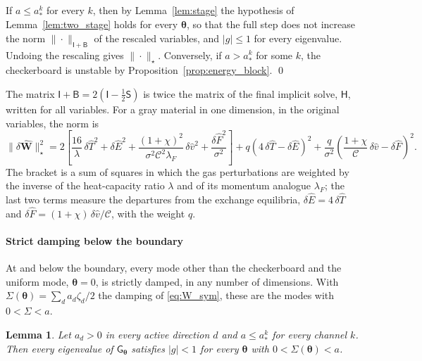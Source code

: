 \documentclass[preprint,12pt,authoryear]{elsarticle}
\newcommand{\tenS}{\mathsf{S}}
\newcommand{\tenI}{\mathsf{I}}
\newcommand{\tenG}{\mathsf{G}}
\providecommand{\tenB}{\mathsf{B}}
\newtheorem{lem}{Lemma}
\providecommand{\tenH}{\mathsf{H}}
\newcommand{\hE}{\hat{E}}
\newcommand{\hv}{\hat{v}}
\newcommand{\hF}{\hat{F}}
\newcommand{\hT}{\hat{T}}
\newcommand{\hvecW}{{\hat{\mathbf{W}}}}
\newcommand{\calC}{\mathcal{C}}
\begin{document}
\begin{appendix}
\begin{pfcb}
If $a \leq a_*^k$ for every $k$, then by Lemma~\ref{lem:stage} the hypothesis of Lemma~\ref{lem:two_stage} holds for every $\boldsymbol{\theta}$, so that the full step does not increase the norm $\|\cdot\|_{\tenI + \tenB}$ of the rescaled variables, and $|g| \leq 1$ for every eigenvalue. Undoing the rescaling gives $\|\cdot\|_\star$. Conversely, if $a > a_*^k$ for some $k$, the checkerboard is unstable by Proposition~\ref{prop:energy_block}. \qed
\end{pfcb}

The matrix $\tenI + \tenB = 2(\tenI - \tfrac{1}{2}\tenS)$ is twice the matrix of the final implicit solve, $\tenH$, written for all variables. For a gray material in one dimension, in the original variables, the norm is
\begin{equation}
    \|\delta\hvecW\|_\star^2 = 2\left[\frac{16}{\lambda}\,\delta\hT^2 + \delta\hE^2 + \frac{(1 + \chi)^2}{\sigma^2\calC^2\lambda_F}\,\delta\hv^2 + \frac{\delta\hF^2}{\sigma^2}\right] + q\left(4\,\delta\hT - \delta\hE\right)^2 + \frac{q}{\sigma^2}\left(\frac{1 + \chi}{\calC}\,\delta\hv - \delta\hF\right)^2 .
    \label{eq:H_star}
\end{equation}
The bracket is a sum of squares in which the gas perturbations are weighted by the inverse of the heat-capacity ratio $\lambda$ and of its momentum analogue $\lambda_F$; the last two terms measure the departures from the exchange equilibria, $\delta\hE = 4\,\delta\hT$ and $\delta\hF = (1 + \chi)\,\delta\hv/\calC$, with the weight $q$.

\paragraph{Strict damping below the boundary} At and below the boundary, every mode other than the checkerboard and the uniform mode, $\boldsymbol{\theta} = 0$, is strictly damped, in any number of dimensions. With $\Sigma(\boldsymbol{\theta}) = \sum_d a_d\zeta_d/2$ the damping of \autoref{eq:W_sym}, these are the modes with $0 < \Sigma < a$.

\begin{lem}
\label{lem:strict}
Let $a_d > 0$ in every active direction $d$ and $a \leq a_*^k$ for every channel $k$. Then every eigenvalue of $\tenG_{\boldsymbol{\theta}}$ satisfies $|g| < 1$ for every $\boldsymbol{\theta}$ with $0 < \Sigma(\boldsymbol{\theta}) < a$.
\end{lem}


\end{appendix}
\end{document}
